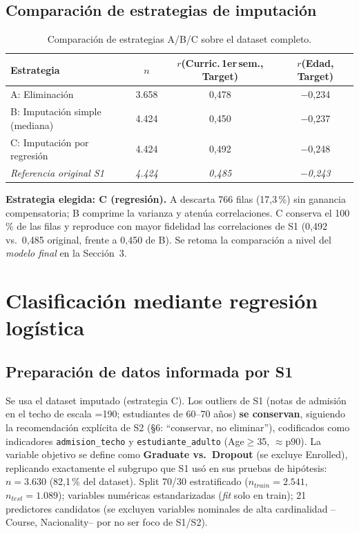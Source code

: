 \documentclass[11pt,a4paper]{article}
\begin{document}
\subsection{Comparación de estrategias de imputación}

\begin{table}[h]
\centering
\small
\begin{tabular}{@{}lccc@{}}
\toprule
Estrategia & $n$ & $r$(Curric.\,1er\,sem., Target) & $r$(Edad, Target) \\
\midrule
A: Eliminación & 3.658 & 0{,}478 & $-$0{,}234 \\
B: Imputación simple (mediana) & 4.424 & 0{,}450 & $-$0{,}237 \\
C: Imputación por regresión & 4.424 & 0{,}492 & $-$0{,}248 \\
\emph{Referencia original S1} & \emph{4.424} & \emph{0{,}485} & \emph{$-$0{,}243} \\
\bottomrule
\end{tabular}
\caption{Comparación de estrategias A/B/C sobre el dataset completo.}
\label{tab:comparacion_estrategias}
\end{table}

\textbf{Estrategia elegida: C (regresión).} A descarta 766 filas (17{,}3\,\%) sin ganancia
compensatoria; B comprime la varianza y atenúa correlaciones. C conserva el 100\,\% de las filas
y reproduce con mayor fidelidad las correlaciones de S1 (0{,}492 vs.\ 0{,}485 original, frente a
0{,}450 de B). Se retoma la comparación a nivel del \emph{modelo final} en la Sección~3.

\section{Clasificación mediante regresión logística}

\subsection{Preparación de datos informada por S1}

Se usa el dataset imputado (estrategia C). Los outliers de S1 (notas de admisión en el techo de
escala =190; estudiantes de 60--70 años) \textbf{se conservan}, siguiendo la recomendación
explícita de S2 (\S6: ``conservar, no eliminar''), codificados como indicadores \texttt{admision\_techo}
y \texttt{estudiante\_adulto} (Age$\geq$35, $\approx$p90). La variable objetivo se define como
\textbf{Graduate vs.\ Dropout} (se excluye Enrolled), replicando exactamente el subgrupo que S1 usó
en sus pruebas de hipótesis: $n=3.630$ (82{,}1\,\% del dataset). Split 70/30 estratificado
($n_{train}=2.541$, $n_{test}=1.089$); variables numéricas estandarizadas (\emph{fit} solo en
train); 21 predictores candidatos (se excluyen variables nominales de alta cardinalidad --Course,
Nacionality-- por no ser foco de S1/S2).
\end{document}
